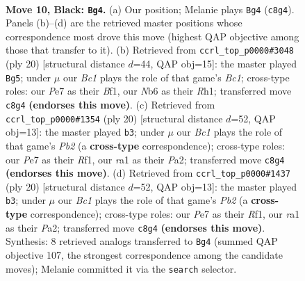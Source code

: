 \documentclass[11pt]{article}
\begin{document}
\clearpage

\begin{figure}[p]\centering
\begin{subfigure}{0.46\textwidth}\centering
\resizebox{\linewidth}{!}{%
\newchessgame
\chessboard[
  setfen={r1b1k2r/ppp1ppbp/1nn3p1/4P3/8/1B3N2/PPP2PPP/RNBK2R1 b kq - 0 10},
  showmover=false,
  pgfstyle=straightmove, color=movearrow, markmove={c8-g4}
]}
\caption{}
\end{subfigure}\hfill
\begin{subfigure}{0.46\textwidth}\centering
\resizebox{\linewidth}{!}{%
\newchessgame
\chessboard[
  setfen={r1bk3r/1pp2ppp/1bn2n2/p3p3/N1P5/P4N2/1P2PPPP/R1B1KB1R w KQ - 2 11},
  showmover=false,
  pgfstyle=straightmove, color=movearrow, markmove={c1-g5}
]}
\caption{}
\end{subfigure}
\\[4pt]
\begin{subfigure}{0.46\textwidth}\centering
\resizebox{\linewidth}{!}{%
\newchessgame
\chessboard[
  setfen={r2k1b1r/pppb1pp1/2p4p/4Pn2/8/2N2N1P/PPP2PP1/R1B2RK1 w - - 0 11},
  showmover=false,
  pgfstyle=straightmove, color=movearrow, markmove={b2-b3}
]}
\caption{}
\end{subfigure}\hfill
\begin{subfigure}{0.46\textwidth}\centering
\resizebox{\linewidth}{!}{%
\newchessgame
\chessboard[
  setfen={r2k1b1r/pppb1pp1/2p4p/4Pn2/8/2N2N1P/PPP2PP1/R1B2RK1 w - - 0 11},
  showmover=false,
  pgfstyle=straightmove, color=movearrow, markmove={b2-b3}
]}
\caption{}
\end{subfigure}
\caption{\textbf{Move 10, Black: \texttt{Bg4}.} (a) Our position; Melanie plays \texttt{Bg4} (\texttt{c8g4}). Panels (b)--(d) are the retrieved master positions whose correspondence most drove this move (highest QAP objective among those that transfer to it). (b) Retrieved from \texttt{ccrl\_top\_p0000\#3048} (ply 20) [structural distance $d$=44, QAP obj=15]: the master played \texttt{Bg5}; under $\mu$ our \emph{Bc1} plays the role of that game's \emph{Bc1}; cross-type roles: our \emph{P}e7 as their \emph{B}f1, our \emph{N}b6 as their \emph{R}h1; transferred move \texttt{c8g4} \textbf{(endorses this move)}. (c) Retrieved from \texttt{ccrl\_top\_p0000\#1354} (ply 20) [structural distance $d$=52, QAP obj=13]: the master played \texttt{b3}; under $\mu$ our \emph{Bc1} plays the role of that game's \emph{Pb2} (a \textbf{cross-type} correspondence); cross-type roles: our \emph{P}e7 as their \emph{R}f1, our \emph{r}a1 as their \emph{P}a2; transferred move \texttt{c8g4} \textbf{(endorses this move)}. (d) Retrieved from \texttt{ccrl\_top\_p0000\#1437} (ply 20) [structural distance $d$=52, QAP obj=13]: the master played \texttt{b3}; under $\mu$ our \emph{Bc1} plays the role of that game's \emph{Pb2} (a \textbf{cross-type} correspondence); cross-type roles: our \emph{P}e7 as their \emph{R}f1, our \emph{r}a1 as their \emph{P}a2; transferred move \texttt{c8g4} \textbf{(endorses this move)}. Synthesis: 8 retrieved analogs transferred to \texttt{Bg4} (summed QAP objective 107, the strongest correspondence among the candidate moves); Melanie committed it via the \texttt{search} selector.}
\label{fig:thought-m19}
\end{figure}
\end{document}
